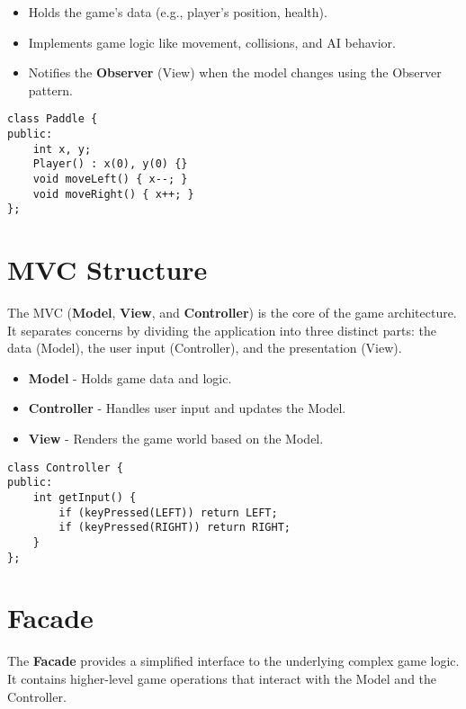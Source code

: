 \documentclass{article}
\begin{document}
\begin{itemize}
    \item Holds the game’s data (e.g., player’s position, health).
    \item Implements game logic like movement, collisions, and AI behavior.
    \item Notifies the \textbf{Observer} (View) when the model changes using the Observer pattern.
\end{itemize}

\begin{center}
    \begin{minipage}[c]{0.5\textwidth}
        \begin{verbatim}
class Paddle {
public:
    int x, y;
    Player() : x(0), y(0) {}
    void moveLeft() { x--; }
    void moveRight() { x++; }
};
        \end{verbatim}
    \end{minipage}
\end{center}

\section{MVC Structure}
The MVC (\textbf{Model}, \textbf{View}, and \textbf{Controller}) is the core of the game architecture. It separates concerns by dividing the application into three distinct parts: the data (Model), the user input (Controller), and the presentation (View).

\begin{itemize}
    \item \textbf{Model} - Holds game data and logic.
    \item \textbf{Controller} - Handles user input and updates the Model.
    \item \textbf{View} - Renders the game world based on the Model.
\end{itemize}

\begin{center}
    \begin{minipage}[c]{0.5\textwidth}
        \begin{verbatim}
class Controller {
public:
    int getInput() {
        if (keyPressed(LEFT)) return LEFT;
        if (keyPressed(RIGHT)) return RIGHT;
    }
};
        \end{verbatim}
    \end{minipage}
\end{center}

\section{Facade}
The \textbf{Facade} provides a simplified interface to the underlying complex game logic. It contains higher-level game operations that interact with the Model and the Controller.
\end{document}
